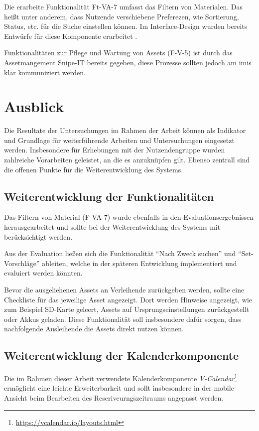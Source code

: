 Die erarbeite Funktionalität Ft-VA-7 umfasst das Filtern von Materialen. Das heißt unter anderem,
dass Nutzende verschiebene Preferezen, wie Sortierung, Status, etc. für die Suche einstellen können.
Im Interface-Design wurden bereits Entwürfe für diese Komponente erarbeitet .

Funktionalitäten zur Pflege und Wartung von Assets (F-V-5) ist durch das Assetmangement
Snipe-IT bereits gegeben, diese Prozesse sollten jedoch am \ac{imis} klar kommuniziert werden.


\section{Ausblick}
Die Resultate der Untersuchungen im Rahmen der Arbeit können als Indikator und Grundlage für
weiterführende Arbeiten und Untersuchungen eingesetzt werden. Insbesondere für Erhebungen mit der
Nutzendengruppe wurden zahlreiche Vorarbeiten geleistet, an die es anzuknüpfen gilt. Ebenso
zentrall sind die offenen Punkte für die Weiterentwicklung des Systems.

\subsection{Weiterentwicklung der Funktionalitäten}
Das Filtern von Material (F-VA-7) wurde ebenfalls in den Evaluationsergebnissen herausgearbeitet und
sollte bei der Weiterentwicklung des Systems mit berücksichtigt werden. 

Aus der Evaluation ließen sich die Funktionalität \enquote{Nach Zweck suchen} und
\enquote{Set-Vorschläge} ableiten, welche in der späteren Entwicklung implementiert und evaluiert
werden könnten.

Bevor die ausgeliehenen Assets an Verleihende zurückgeben werden, sollte eine Checkliste
für das jeweilige Asset angezeigt. Dort werden Hinweise angezeigt, wie zum Beispiel
SD-Karte geleert, Assets auf Ursprungseinstellungen zurückgestellt oder Akkus geladen. Diese
Funktionalität soll insbesondere dafür sorgen, dass nachfolgende Ausleihende die Assets
direkt nutzen können.

\subsection{Weiterentwicklung der Kalenderkomponente}
Die im Rahmen dieser Arbeit verwendete Kalenderkomponente
\textit{V-Calendar}\footnote{\url{https://vcalendar.io/layouts.html}} ermöglicht eine leichte
Erweiterbarkeit und sollt insbesondere in der mobile Ansicht beim Bearbeiten des
Reseriveurngszeitraums angepasst werden.

